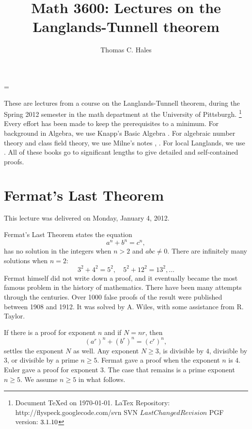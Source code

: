 \documentclass{amsart}
\def\svninfo{%
  \noindent
  Document TeXed on \today. \hfill\break
  LaTex Repository: http://flyspeck.googlecode.com/svn \hfill\break
  SVN $LastChangedRevision$\hfill\break
  PGF version: $\pgftypesetversion$
  }
\begin{document}
\title{Math 3600: Lectures on the Langlands-Tunnell theorem}
\author{Thomas C. Hales}
\maketitle


    \tableofcontents





\parindent=0pt
\parskip=\baselineskip
\def\seg{~~~}
\def\text{\hbox}

These are lectures from a course on the Langlands-Tunnell theorem, during
the Spring 2012 semester in the math department at the University of Pittsburgh.%
\footnote{\svninfo}
Every effort has been made to keep the prerequisites to a minimum.
For background in Algebra, we use Knapp's Basic Algebra \cite{knapp-basic}.
For algebraic number theory and class field theory, 
we use Milne's notes 
\cite{ANT}, \cite{CFT}.  For local Langlands, we use \cite{bushnell-henniart}.
All of these books go to significant lengths to give detailed and self-contained 
proofs.

\section{Fermat's Last Theorem}

This lecture was delivered on Monday, January 4, 2012.

Fermat's Last Theorem \cite{DDT} states the equation
\[
a^n + b^n = c^n,
\]
has no solution in the integers when $n>2$ and $abc\ne 0$.  There are
infinitely many solutions when $n=2$:
\[
3^2 + 4^2 = 5^2,\quad 5^2 + 12^2 = 13^2, \ldots
\]
Fermat himself did not write down a proof, and it eventually became
the most famous problem in the history of mathematics.  There have
been many attempts through the centuries.  Over 1000 false proofs of
the result were published between 1908 and 1912.  It was solved by
A. Wiles, with some assistance from R. Taylor.

If there is a proof for exponent $n$ and if $N = n r$, then
\[
(a^r)^n + (b^r)^n = (c^r)^n,
\]
settles the exponent $N$ as well.  Any exponent $N\ge3$, is divisible
by $4$, divisible by $3$, or divisible by a prime $n\ge 5$.  Fermat
gave a proof when the exponent $n$ is $4$.  Euler gave a proof for
exponent $3$.  The case that remains is a prime exponent $n\ge 5$.  We
assume $n\ge5$ in what follows.
\end{document}
